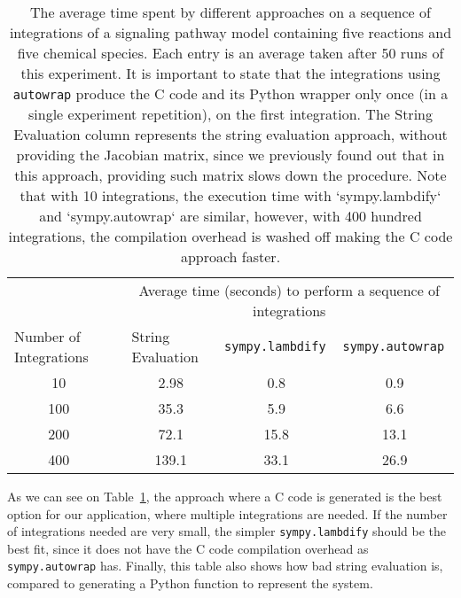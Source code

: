 \begin{table}[]
\centering
\begin{tabular}{c c ccc}
\hline
\multicolumn{1}{l}{} 
&& \multicolumn{3}{c}{Average time (seconds) to perform a sequence of 
    integrations} \\
\multicolumn{1}{l}{Number of Integrations}               
&& \multicolumn{1}{l}{String Evaluation} 
& \multicolumn{1}{l}{{\tt sympy.lambdify}} 
& \multicolumn{1}{l}{{\tt sympy.autowrap}} \\ \hline 
    10  &&   2.98    & 0.8   & 0.9 \\
    100 && 35.3      & 5.9   & 6.6 \\ 
    200 && 72.1      & 15.8  & 13.1 \\
    400 && 139.1     & 33.1  & 26.9 \\
\hline \hline
\end{tabular}
\caption{The average time spent by different approaches on a sequence of
integrations of a signaling pathway model containing five reactions and
five chemical species. Each entry is an average taken after 50 runs of 
this experiment. It is important to state that the integrations using 
{\tt autowrap} produce the C code and its Python wrapper only once (in a
single experiment repetition), on the first integration. The String
Evaluation column represents the string evaluation approach, without
providing the Jacobian matrix, since we previously found out that in
this approach, providing such matrix slows down the procedure. Note that
with 10 integrations, the execution time with `sympy.lambdify` and
`sympy.autowrap` are similar, however, with 400 hundred integrations,
the compilation overhead is washed off making the C code approach
faster.}
\label{tab:system_representation_experiment}
\end{table}

As we can see on Table~\ref{tab:system_representation_experiment}, the
approach where a C code is generated  is the best option for our 
application, where multiple integrations are needed. If the number of 
integrations needed are very small, the simpler {\tt sympy.lambdify} 
should be the best fit, since it does not have the C code compilation 
overhead as {\tt sympy.autowrap} has. Finally, this table also shows how
bad string evaluation is, compared to generating a Python function to
represent the system. 


